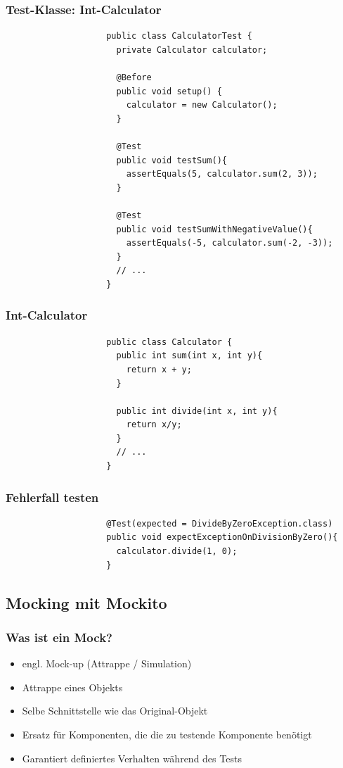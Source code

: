\documentclass{beamer}
\begin{document}
			\begin{frame}[fragile]
				\frametitle{Test-Klasse: Int-Calculator}

				\begin{lstlisting}
					public class CalculatorTest {
					  private Calculator calculator;

					  @Before
					  public void setup() {
					    calculator = new Calculator();
					  }

					  @Test
					  public void testSum(){
					    assertEquals(5, calculator.sum(2, 3));
					  }

					  @Test
					  public void testSumWithNegativeValue(){
					    assertEquals(-5, calculator.sum(-2, -3));
					  }
					  // ...
					}
				\end{lstlisting}
			\end{frame}
		
			\begin{frame}[fragile]
				\frametitle{Int-Calculator}

				\begin{lstlisting}
					public class Calculator {
					  public int sum(int x, int y){
					    return x + y;
					  }

					  public int divide(int x, int y){
					    return x/y;
					  }
					  // ...
					}
				\end{lstlisting}
			\end{frame}

			\begin{frame}[fragile]
				\frametitle{Fehlerfall testen}

				\begin{lstlisting}
					@Test(expected = DivideByZeroException.class)
					public void expectExceptionOnDivisionByZero(){
					  calculator.divide(1, 0);
					}
				\end{lstlisting}
			\end{frame}

		\subsection{Mocking mit Mockito}

			\begin{frame}
				\frametitle{Was ist ein Mock?}

				\begin{itemize}
					\item{engl. Mock-up (Attrappe / Simulation)}
					\item{Attrappe eines Objekts}
					\item{Selbe Schnittstelle wie das Original-Objekt}
					\item{Ersatz für Komponenten, die die zu testende Komponente benötigt}
					\item{Garantiert definiertes Verhalten während des Tests}
				\end{itemize}
			\end{frame}
\end{document}
